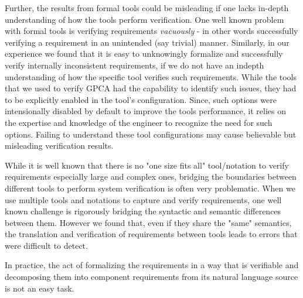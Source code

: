 Further, the results from formal tools could be misleading if one lacks in-depth understanding of how the tools perform verification. One well known problem with formal tools is verifying requirements \emph{vacuously} - in other words successfully verifying a requirement in an unintended (say trivial) manner. Similarly, in our experience we found that it is easy to unknowingly formalize and successfully verify internally inconsistent requirements, if we do not have an indepth understanding of how the specific tool verifies such requirements. While the tools that we used to verify GPCA had the capability to identify such issues, they had to be explicitly enabled in the tool's configuration. Since, such options were intensionally disabled by default to improve the tools performance, it relies on the expertise and knowledge of the engineer to recognize the need for such options. Failing to understand these tool configurations may cause believable but misleading verification results.

While it is well known that there is no "one size fits all" tool/notation to verify requirements especially large and complex ones, bridging the boundaries between different tools to perform system verification is often very problematic. When we use multiple tools and notations to capture and verify requirements, one well known challenge is rigorously bridging the syntactic and semantic differences between them. However we found that, even if they share the "same" semantics, the translation and verification of requirements between tools leads to errors that were difficult to detect.

In practice, the act of formalizing the requirements in a way that is verifiable and decomposing them into component requirements from its natural language source is not an easy task.

\fi
